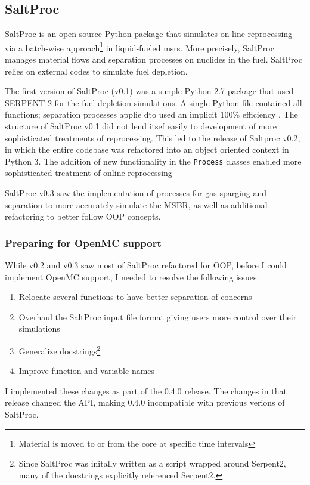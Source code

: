\subsection{SaltProc}%
\label{sub:saltproc}

SaltProc\cite{rykhlevskii_saltproc_2018} is an open source Python package that simulates on-line reprocessing via a batch-wise approach\footnote{Material is moved to or from the core at specific time intervals} in liquid-fueled \Gls{msr}s. More precisely, SaltProc manages material flows and separation processes on nuclides in the fuel. SaltProc relies on external codes to simulate fuel depletion.

The first version of SaltProc (v0.1) was a simple Python 2.7 package that used SERPENT 2 for the fuel depletion simulations. A single Python file contained all functions; separation processes applie dto  used an implicit 100\% efficiency \cite{rykhlevskii_advanced_2018}. The structure of SaltProc v0.1 did not lend itsef easily to development of more sophisticated treatments of reprocessing. This led to the release of Saltproc v0.2, in which the entire codebase was refactored into an object oriented
context in Python 3. The addition of new functionality in the \verb.Process. classes enabled more sophisticated treatment of online reprocessing \cite{rykhlevskii_fuel_2020} 

SaltProc v0.3 saw the implementation of processes for gas sparging and separation to more accurately simulate the MSBR, as well as additional refactoring to better follow OOP concepts.

\subsubsection{Preparing for OpenMC support}%
While v0.2 and v0.3 saw most of SaltProc refactored for OOP, before I could implement OpenMC support, I needed to resolve the following issues:
\begin{enumerate}
    \item Relocate several functions to have better separation of concerns
    \item Overhaul the SaltProc input file format giving users more control over their simulations
    \item Generalize docstrings\footnote{Since SaltProc was initally written as a script wrapped around Serpent2, many of the docstrings explicitly referenced Serpent2.}
    \item Improve function and variable names
\end{enumerate}
I implemented these changes as part of the 0.4.0 release. The changes in that release changed the API, making 0.4.0 incompatible with previous verions of SaltProc.

